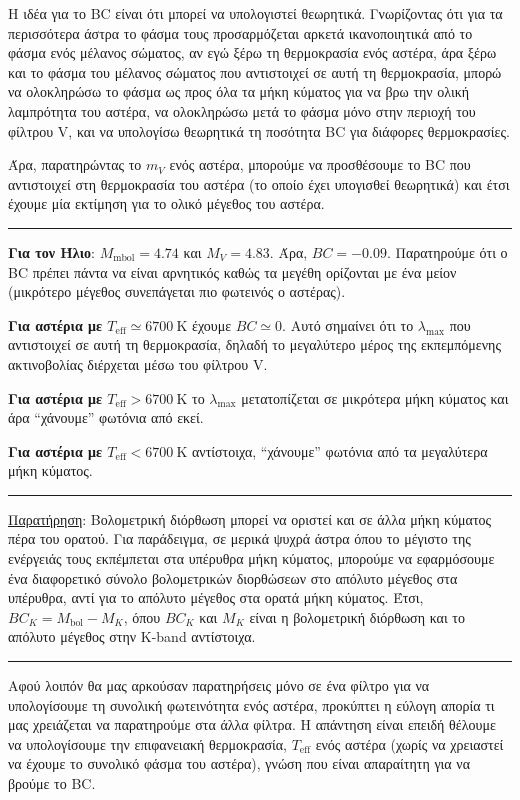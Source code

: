 Η ιδέα για το BC είναι ότι {\color{blue}μπορεί να υπολογιστεί θεωρητικά}. Γνωρίζοντας ότι για τα περισσότερα άστρα το φάσμα τους προσαρμόζεται αρκετά ικανοποιητικά από το φάσμα ενός μέλανος σώματος, αν εγώ ξέρω τη θερμοκρασία ενός αστέρα, άρα ξέρω και το φάσμα του μέλανος σώματος που αντιστοιχεί σε αυτή τη θερμοκρασία, μπορώ να ολοκληρώσω το φάσμα ως προς όλα τα μήκη κύματος για να βρω την ολική λαμπρότητα του αστέρα, να ολοκληρώσω μετά το φάσμα μόνο στην περιοχή του φίλτρου V, και να υπολογίσω θεωρητικά τη ποσότητα BC για διάφορες θερμοκρασίες.

Άρα, παρατηρώντας το $m_V$ ενός αστέρα, μπορούμε να προσθέσουμε το BC που αντιστοιχεί στη θερμοκρασία του αστέρα (το οποίο έχει υπογισθεί θεωρητικά) και έτσι έχουμε μία εκτίμηση για το ολικό μέγεθος του αστέρα.
\\
{\color{red} \hrule}
\textbf{Για τον Ήλιο}: $M_{\text{mbol}} = 4.74$ και $M_V = 4.83$. Άρα, $BC = -0.09$.
Παρατηρούμε ότι ο BC πρέπει πάντα να είναι αρνητικός καθώς τα μεγέθη ορίζονται με ένα μείον (μικρότερο μέγεθος συνεπάγεται πιο φωτεινός ο αστέρας).

\textbf{Για αστέρια με $T_{\text{eff}} \simeq 6700 \ \text{K}$} έχουμε $BC \simeq 0$. Αυτό σημαίνει ότι το $\lambda_{\text{max}}$ που αντιστοιχεί σε αυτή τη θερμοκρασία, δηλαδή το μεγαλύτερο μέρος της εκπεμπόμενης ακτινοβολίας διέρχεται μέσω του φίλτρου V.

\textbf{Για αστέρια με $T_{\text{eff}} > 6700 \ \text{K}$} το $\lambda_{\text{max}}$ μετατοπίζεται σε μικρότερα μήκη κύματος και άρα ``χάνουμε'' φωτόνια από εκεί.

\textbf{Για αστέρια με $T_{\text{eff}} < 6700 \ \text{K}$} αντίστοιχα, ``χάνουμε'' φωτόνια από τα μεγαλύτερα μήκη κύματος.
{\color{red} \hrule}

\underline{Παρατήρηση}: Βολομετρική διόρθωση μπορεί να οριστεί και σε άλλα μήκη κύματος πέρα του ορατού. Για παράδειγμα, σε μερικά ψυχρά άστρα όπου το μέγιστο της ενέργειάς τους εκπέμπεται στα υπέρυθρα μήκη κύματος, μπορούμε να εφαρμόσουμε ένα διαφορετικό σύνολο βολομετρικών διορθώσεων στο απόλυτο μέγεθος στα υπέρυθρα, αντί για το απόλυτο μέγεθος στα ορατά μήκη κύματος. Έτσι, $BC_K = M_{\text{bol}} - M_K$, όπου $BC_K$ και $M_K$ είναι η βολομετρική διόρθωση και το απόλυτο μέγεθος στην K-band αντίστοιχα.  
\hrule

Αφού λοιπόν θα μας αρκούσαν παρατηρήσεις μόνο σε ένα φίλτρο για να υπολογίσουμε τη συνολική φωτεινότητα ενός αστέρα, προκύπτει η εύλογη απορία τι μας χρειάζεται να παρατηρούμε στα άλλα φίλτρα. Η απάντηση είναι επειδή θέλουμε να υπολογίσουμε την επιφανειακή θερμοκρασία, $T_{\text{eff}}$ ενός αστέρα (χωρίς να χρειαστεί να έχουμε το συνολικό φάσμα του αστέρα), γνώση που είναι απαραίτητη για να βρούμε το BC.


